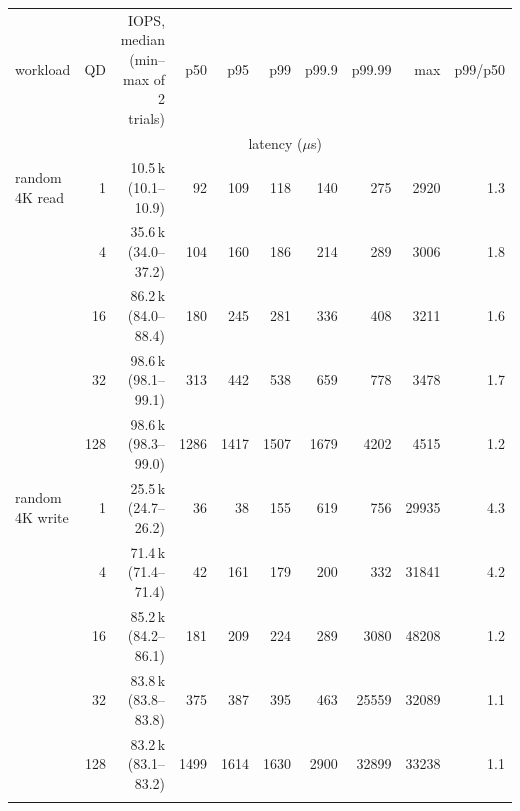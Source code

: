 \begin{tabular}{lrrrrrrrrr}
\toprule
workload & QD & IOPS, median (min--max of 2 trials) & p50 & p95 & p99 & p99.9 & p99.99 & max & p99/p50 \\
 & & & \multicolumn{5}{c}{latency ($\mu$s)} & & \\
\midrule
random 4K read & 1 & 10.5\,k (10.1--10.9) & 92 & 109 & 118 & 140 & 275 & 2920 & 1.3 \\
 & 4 & 35.6\,k (34.0--37.2) & 104 & 160 & 186 & 214 & 289 & 3006 & 1.8 \\
 & 16 & 86.2\,k (84.0--88.4) & 180 & 245 & 281 & 336 & 408 & 3211 & 1.6 \\
 & 32 & 98.6\,k (98.1--99.1) & 313 & 442 & 538 & 659 & 778 & 3478 & 1.7 \\
 & 128 & 98.6\,k (98.3--99.0) & 1286 & 1417 & 1507 & 1679 & 4202 & 4515 & 1.2 \\
\addlinespace
random 4K write & 1 & 25.5\,k (24.7--26.2) & 36 & 38 & 155 & 619 & 756 & 29935 & 4.3 \\
 & 4 & 71.4\,k (71.4--71.4) & 42 & 161 & 179 & 200 & 332 & 31841 & 4.2 \\
 & 16 & 85.2\,k (84.2--86.1) & 181 & 209 & 224 & 289 & 3080 & 48208 & 1.2 \\
 & 32 & 83.8\,k (83.8--83.8) & 375 & 387 & 395 & 463 & 25559 & 32089 & 1.1 \\
 & 128 & 83.2\,k (83.1--83.2) & 1499 & 1614 & 1630 & 2900 & 32899 & 33238 & 1.1 \\
\addlinespace
\bottomrule
\end{tabular}
